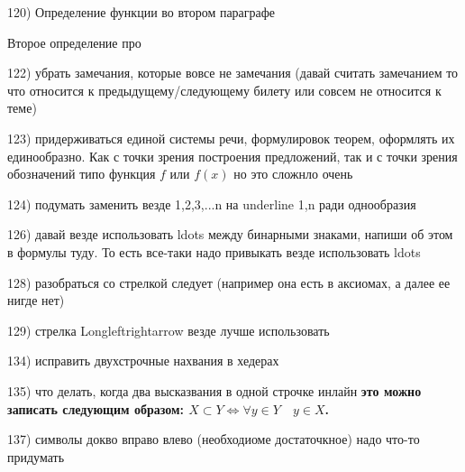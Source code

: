 120) Определение функции во втором параграфе 

Второе определение про 
\begin{defnn}
\end{defnn}

122) убрать замечания, которые вовсе не замечания (давай считать замечанием то что относится к предыдущему/следующему билету или совсем не относится к теме)

123) придерживаться единой системы речи, формулировок теорем, оформлять их единообразно. Как с точки зрения построения предложений, так и с точки зрения обозначений типо функция $f$ или $f(x)$ но это сложнло очень

124) подумать заменить везде 1,2,3,...n на underline 1,n ради однообразия

126) давай везде использовать ldots между бинарными знаками, напиши об этом в формулы туду. То есть все-таки надо привыкать везде использовать ldots

128) разобраться со стрелкой следует (например она есть в аксиомах, а далее ее нигде нет)

129) стрелка Longleftrightarrow везде лучше использовать

134) исправить двухстрочные нахвания в хедерах

135) что делать, когда два высказвания в одной строчке инлайн   \textbf{это можно записать следующим образом: $X \subset Y \Longleftrightarrow \forall y\in Y\quad  y\in X$.}

137) символы докво вправо влево (необходиоме достаточкное) надо что-то придумать

